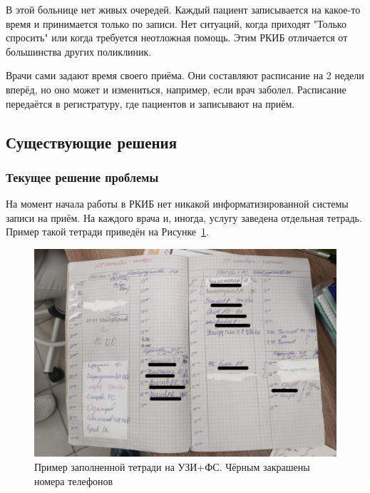 \documentclass[a4paper,article]{article}
\begin{document}
        В этой больнице нет живых очередей. Каждый пациент записывается на какое-то время и принимается только по записи. Нет ситуаций, когда приходят "Только спросить" или когда требуется неотложная помощь. Этим РКИБ отличается от большинства других поликлиник.

        Врачи сами задают время своего приёма. Они составляют расписание на 2 недели вперёд, но оно может и измениться, например, если врач заболел. Расписание передаётся в регистратуру, где пациентов и записывают на приём.

    \subsection{Существующие решения}

    \subsubsection{Текущее решение проблемы}\label{Текущее решение проблемы}

        На момент начала работы в РКИБ нет никакой информатизированной системы записи на приём. На каждого врача и, иногда, услугу заведена отдельная тетрадь. Пример такой тетради приведён на Рисунке~\ref{fig:Тетрадь на УЗИ+ФС}.

        \begin{figure}[h]

            \centering

            \includegraphics[width=0.8\linewidth]{Пример заполненной тетради на УЗИ+ФС. Чёрным закрашены номера телефонов.png}

            \caption{\centering Пример заполненной тетради на УЗИ+ФС. Чёрным закрашены номера телефонов}

            \label{fig:Тетрадь на УЗИ+ФС}

        \end{figure}
\end{document}
